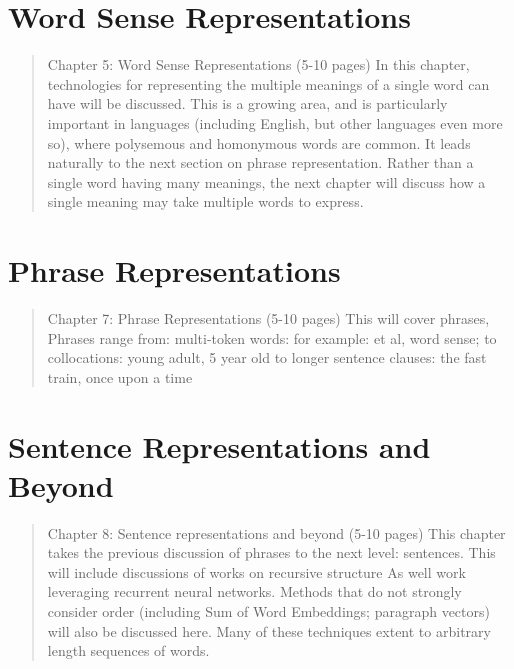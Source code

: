 \documentclass[12pt,parskip]{komatufte}
\begin{document}





\chapter{Word Sense Representations}\label{sec:word-sense-representations}
\begin{abstract}
Chapter 5: Word Sense Representations (5-10 pages)
In this chapter, technologies for representing the multiple meanings of a single word can have will be discussed.
This is a growing area, and is particularly important in languages (including English, but other languages even more so), where polysemous and homonymous words are common.
It leads naturally to the next section on phrase representation. Rather than a single word having many meanings, the next chapter will discuss how a single meaning may take multiple words to express.
\end{abstract}



\chapter{Phrase Representations}\label{sec:phrase-representations}
\begin{abstract}
Chapter 7: Phrase Representations (5-10 pages)
This will cover phrases, 
Phrases range from:
multi-token words: for example: et al, word sense;
to collocations: young adult, 5 year old
to longer sentence clauses: the fast train, once upon a time
\end{abstract}

\chapter{Sentence Representations and Beyond}\label{sec:sentence-representations-and-beyond}
\begin{abstract}
Chapter 8: Sentence representations and beyond (5-10 pages)
This chapter takes the previous discussion of phrases to the next level: sentences.
This will include discussions of works on recursive structure
As well work leveraging recurrent neural networks.
Methods that do not strongly consider order (including Sum of Word Embeddings; paragraph vectors) will also be discussed here.
Many of these techniques extent to arbitrary length sequences of words.
\end{abstract}
\end{document}
